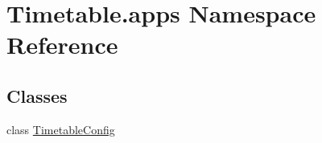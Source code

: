 \hypertarget{namespaceTimetable_1_1apps}{}\section{Timetable.\+apps Namespace Reference}
\label{namespaceTimetable_1_1apps}
\subsection*{Classes}
\begin{DoxyCompactItemize}
\item 
class \hyperlink{classTimetable_1_1apps_1_1TimetableConfig}{Timetable\+Config}
\end{DoxyCompactItemize}
